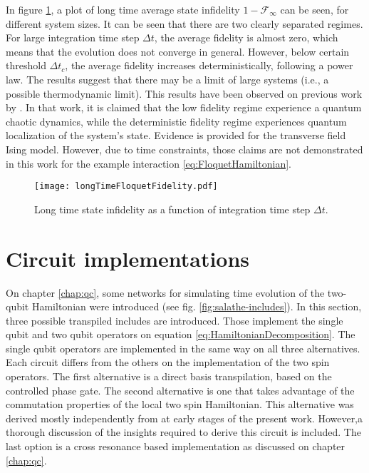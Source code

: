     In figure \ref{fig:FloquetDynamics}, a plot of long time average state infidelity $1-\mathcal{F}_\infty$ can be seen, for different system sizes. It can be seen that there are two clearly separated regimes. For large integration time step $\Delta t$, the average fidelity is almost zero, which means that the evolution does not converge in general. However, below certain threshold $\Delta t_c$, the average fidelity increases deterministically, following a power law. The results suggest that there may be a limit of large systems (i.e., a possible thermodynamic limit). This results have been observed on previous work by \cite{FloquetTrotter}. In that work, it is claimed that the low fidelity regime experience a quantum chaotic dynamics, while the deterministic fidelity regime experiences quantum localization of the system's state. Evidence is provided for the transverse field Ising model. However, due to time constraints, those claims are not demonstrated in this work for the example interaction \ref{eq:FloquetHamiltonian}.

    \begin{figure}
      \centering
      \texttt{[image: longTimeFloquetFidelity.pdf]}
      \caption{Long time state infidelity as a function of integration time step $\Delta t$.}
      \label{fig:FloquetDynamics}
    \end{figure}

\section{Circuit implementations}
\label{sec:MainCircuits}
  
  On chapter \ref{chap:qc}, some networks for simulating time evolution of the two-qubit Hamiltonian were introduced (see fig. \ref{fig:salathe-includes}). In this section, three possible transpiled includes are introduced. Those implement the single qubit and two qubit operators on equation \ref{eq:HamiltonianDecomposition}. The single qubit operators are implemented in the same way on all three alternatives. Each circuit differs from the others on the implementation of the two spin operators. The first alternative is a direct basis transpilation, based on the controlled phase gate. The second alternative is one that takes advantage of the commutation properties of the local two spin Hamiltonian. This alternative was derived mostly independently from \cite{BellUniversalCartan} at early stages of the present work. However,a thorough discussion of the insights required to derive this circuit is included. The last option is a cross resonance based implementation as discussed on chapter \ref{chap:qc}.

